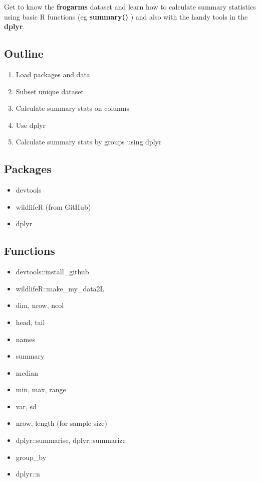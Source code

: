 \documentclass[]{book}
\providecommand{\tightlist}{%
  \setlength{\itemsep}{0pt}\setlength{\parskip}{0pt}}
\theoremstyle{definition}
\theoremstyle{definition}
\theoremstyle{definition}
\theoremstyle{remark}
\begin{document}
Get to know the \textbf{frogarms} dataset and learn how to calculate
summary statistics using basic R functions (eg \textbf{summary()} ) and
also with the handy tools in the \textbf{dplyr}.

\subsection{Outline}\label{outline-2}

\begin{enumerate}
\def\labelenumi{\arabic{enumi}.}
\tightlist
\item
  Load packages and data
\item
  Subset unique dataset
\item
  Calculate summary stats on columns
\item
  Use dplyr
\item
  Calculate summary stats by groups using dplyr
\end{enumerate}

\subsection{Packages}\label{packages-7}

\begin{itemize}
\tightlist
\item
  devtools
\item
  wildlifeR (from GitHub)
\item
  dplyr
\end{itemize}

\subsection{Functions}\label{functions-1}

\begin{itemize}
\tightlist
\item
  devtools::install\_github
\item
  wildlifeR::make\_my\_data2L
\item
  dim, nrow, ncol
\item
  head, tail
\item
  names
\item
  summary
\item
  median
\item
  min, max, range
\item
  var, sd
\item
  nrow, length (for sample size)
\item
  dplyr::summarise, dplyr::summarize
\item
  group\_by
\item
  dplyr::n
\end{itemize}
\end{document}
